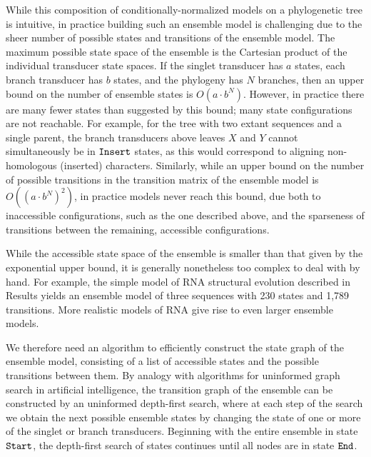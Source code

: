 \documentclass[10pt]{article}
\begin{document}
While this composition of conditionally-normalized models on a
phylogenetic tree is intuitive, in practice building such an ensemble
model is challenging due to the sheer number of possible states and
transitions of the ensemble model.
The maximum possible state space of the ensemble is the Cartesian product of the
individual transducer state spaces. If the singlet transducer has $a$
states, each branch transducer has $b$ states, and the phylogeny has $N$
branches, then an upper bound on the number of
ensemble states is $O(a \cdot b^N)$.
However, in practice there are many fewer states than suggested by
this bound; many state configurations are not reachable.  For example,
for the tree with two extant sequences and a single parent,
the branch transducers above leaves $X$ and $Y$ cannot simultaneously
be in $\mathtt{Insert}$ states, as this would correspond to aligning
non-homologous (inserted) characters.
Similarly, while an upper bound on the number of possible transitions
in the transition matrix of the ensemble model is $O((a \cdot b^N)^2)$,
in practice models never reach this bound,
due both to inaccessible configurations, such as the one described above,
and the sparseness of transitions between the remaining, accessible configurations.

While the accessible state space of the ensemble is smaller than that
given by the exponential upper bound, it is generally nonetheless too
complex to deal with by hand.
For example, the simple model of RNA structural evolution described in
Results yields an ensemble model of three sequences with 230 states
and 1,789 transitions.  More realistic models of RNA give rise to even
larger ensemble models.

We therefore need an algorithm to efficiently construct the state graph of the
ensemble model, consisting of a list of accessible states and the
possible transitions between them. 
By analogy with algorithms for uninformed graph search in artificial
intelligence, the transition graph of the ensemble can be constructed
by an uninformed depth-first search, where at each step of the search
we obtain the next possible ensemble states by changing the state of one or
more of the singlet or branch transducers. Beginning with the entire
ensemble in state $\mathtt{Start}$, the depth-first search of states
continues until all nodes are in state $\mathtt{End}$.
\end{document}
